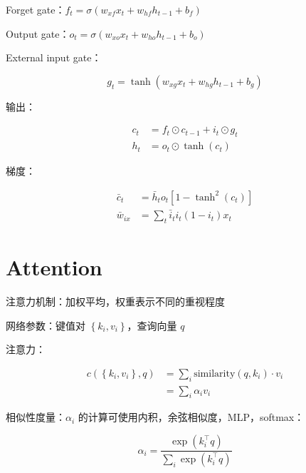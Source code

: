 \documentclass[openany,a4paper,12pt]{ctexbook}
\theoremstyle{kaiti}
\theoremstyle{normal}
\begin{document}
Forget gate：$f_t=\sigma \left(w_{xf}x_t+w_{hf}h_{t-1}+b_f \right)$

Output gate：$o_t=\sigma \left(w_{xo}x_t+w_{ho}h_{t-1}+b_o \right)$

External input gate：

\begin{equation}
g_t=\tanh \left(w_{xg}x_t+w_{hg}h_{t-1}+b_g \right)
\end{equation}

输出：

\begin{equation}
\begin{aligned}
  c_t&=f_t\odot c_{t-1}+i_t\odot g_t\\
  h_t&=o_t\odot \tanh \left(c_t \right)
\end{aligned}
\end{equation}

梯度：

\begin{equation}
\begin{aligned}
  \bar{c}_t&=\bar{h}_to_t\left[1-\tanh^2\left(c_t \right)\right] \\
  \bar{w}_{ix}&=\sum_t\bar{i}_ti_t\left(1-i_t \right)x_t
\end{aligned}
\end{equation}

\section{Attention}

注意力机制：加权平均，权重表示不同的重视程度

网络参数：键值对 $\left\{ k_i,v_i \right\}$，查询向量 $q$

注意力：

\begin{equation}
\begin{aligned}
  c\left(\left\{ k_i,v_i \right\} ,q \right)&=\sum_i\mathrm{similarity}\left(q,k_i \right)\cdot v_i\\
  &=\sum_i\alpha_iv_i
\end{aligned}
\end{equation}

相似性度量：$\alpha_i$ 的计算可使用内积，余弦相似度，MLP，softmax：

\begin{equation}
\alpha_i=\frac{\exp \left(k_{i}^{\top}q \right)}{\sum_i\exp \left(k_{i}^{\top}q \right)}
\end{equation}
\end{document}
